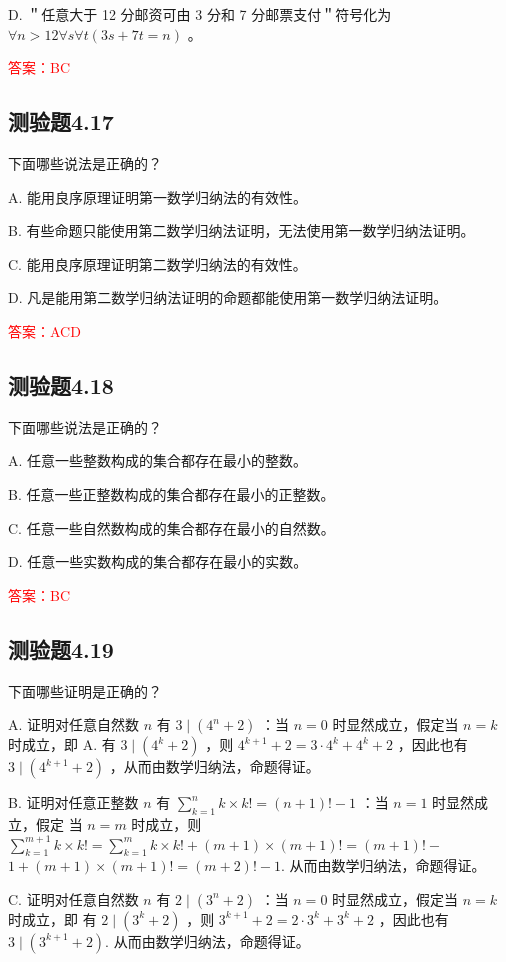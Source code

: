 \documentclass[UTF8, heading=true]{ctexart}
\begin{document}
D. ＂任意大于 12 分邮资可由 3 分和 7 分邮票支付＂符号化为 $\forall n>12 \forall s \forall t(3 s+7 t=n)$ 。

\textcolor{red}{答案：BC}


\subsection{测验题4.17}

下面哪些说法是正确的？

A. 能用良序原理证明第一数学归纳法的有效性。

B. 有些命题只能使用第二数学归纳法证明，无法使用第一数学归纳法证明。

C. 能用良序原理证明第二数学归纳法的有效性。

D. 凡是能用第二数学归纳法证明的命题都能使用第一数学归纳法证明。

\textcolor{red}{答案：ACD}

\subsection{测验题4.18}

下面哪些说法是正确的？

A. 
任意一些整数构成的集合都存在最小的整数。

B. 
任意一些正整数构成的集合都存在最小的正整数。

C. 
任意一些自然数构成的集合都存在最小的自然数。

D. 
任意一些实数构成的集合都存在最小的实数。

\textcolor{red}{答案：BC}

\subsection{测验题4.19}

下面哪些证明是正确的？

A. 证明对任意自然数 $n$ 有 $3 \mid\left(4^n+2\right)$ ：当 $n=0$ 时显然成立，假定当 $n=k$ 时成立，即 A. 有 $3 \mid\left(4^k+2\right)$ ，则 $4^{k+1}+2=3 \cdot 4^k+4^k+2$ ，因此也有 $3 \mid\left(4^{k+1}+2\right)$ ，从而由数学归纳法，命题得证。

B. 证明对任意正整数 $n$ 有 $\sum_{k=1}^n k \times k!=(n+1)!-1$ ：当 $n=1$ 时显然成立，假定
当 $n=m$ 时成立，则 $\sum_{k=1}^{m+1} k \times k!=\sum_{k=1}^m k \times k!+(m+1) \times(m+1)!=(m+1)!-$ $1+(m+1) \times(m+1)!=(m+2)!-1$. 从而由数学归纳法，命题得证。

C. 证明对任意自然数 $n$ 有 $2 \mid\left(3^n+2\right)$ ：当 $n=0$ 时显然成立，假定当 $n=k$ 时成立，即
有 $2 \mid\left(3^k+2\right)$ ，则 $3^{k+1}+2=2 \cdot 3^k+3^k+2$ ，因此也有 $3 \mid\left(3^{k+1}+2\right)$. 从而由数学归纳法，命题得证。
\end{document}
